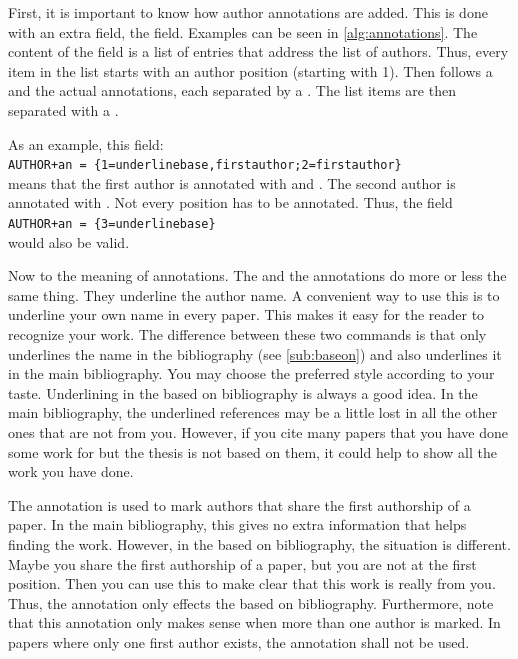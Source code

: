 First, it is important to know how author annotations are added. This is done
with an extra field, the  field. Examples can be seen in
\autoref{alg:annotations}. The content of the field is a list of entries that
address the list of authors. Thus, every item in the list starts with an
author position (starting with 1). Then follows a \quo{=} and the actual
annotations, each separated by a \quo{,}. The list items are then separated with
a \quo{;}.

As an example, this field: \\
\verb|AUTHOR+an = {1=underlinebase,firstauthor;2=firstauthor}|\\
means that the first author is annotated with  and
. The second author is annotated with
. Not every position has to be annotated. Thus,
the field \\\verb|AUTHOR+an = {3=underlinebase}|\\ would also be valid.

Now to the meaning of annotations. The  and the
 annotations do more or less the same thing. They
underline the author name. A convenient way to use this is to underline your
own name in every paper. This makes it easy for the reader to recognize your
work. The difference between these two commands is that 
only underlines the name in the  bibliography (see
\autoref{sub:baseon}) and  also underlines it in the main
bibliography. You may choose the preferred style according to your taste.
Underlining in the based on bibliography is always a good idea. In the main
bibliography, the underlined references may be a little lost in all the other
ones that are not from you.  However, if you cite many papers that you have
done some work for but the thesis is not based on them, it could help to show
all the work you have done.

The  annotation is used to mark authors that share the
first authorship of a paper. In the main bibliography, this gives no extra
information that helps finding the work. However, in the based on
bibliography, the situation is different. Maybe you share the first authorship
of a paper, but you are not at the first position. Then you can use this to
make clear that this work is really from you. Thus, the annotation only
effects the based on bibliography. Furthermore, note that this annotation only
makes sense when more than one author is marked. In papers where only one
first author exists, the annotation shall not be used.

